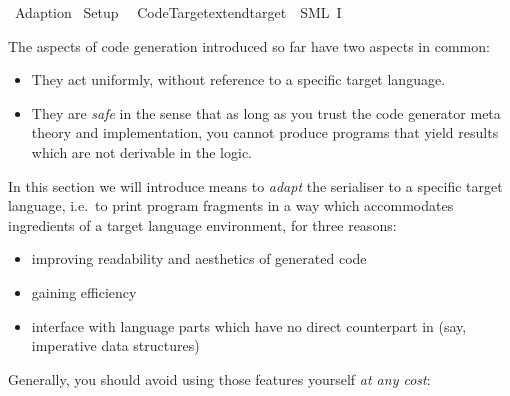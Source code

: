 %
\begin{isabellebody}%
\def\isabellecontext{Adaption}%
%
\isadelimtheory
%
\endisadelimtheory
%
\isatagtheory
{}\isamarkupfalse%
\ Adaption\isanewline
{}\ Setup\isanewline
{}%
\endisatagtheory
{\isafoldtheory}%
%
\isadelimtheory
\isanewline
%
\endisadelimtheory
%
\isadeliminvisible
\isanewline
%
\endisadeliminvisible
%
\isataginvisible
{}\isamarkupfalse%
\ {\isacharverbatimopen}\ Code{\isacharunderscore}Target{\isachardot}extend{\isacharunderscore}target\ {\isacharparenleft}{\isachardoublequote}{\isasymSML}{\isachardoublequote}{\isacharcomma}\ {\isacharparenleft}{\isachardoublequote}SML{\isachardoublequote}{\isacharcomma}\ I{\isacharparenright}{\isacharparenright}\ {\isacharverbatimclose}%
\endisataginvisible
{\isafoldinvisible}%
%
\isadeliminvisible
%
\endisadeliminvisible
%
\isamarkuptrue%
%
\isamarkuptrue%
%
\begin{isamarkuptext}%
The aspects of code generation introduced so far have two aspects
  in common:

  \begin{itemize}
    \item They act uniformly, without reference to a specific
       target language.
    \item They are \emph{safe} in the sense that as long as you trust
       the code generator meta theory and implementation, you cannot
       produce programs that yield results which are not derivable
       in the logic.
  \end{itemize}

  \noindent In this section we will introduce means to \emph{adapt} the serialiser
  to a specific target language, i.e.~to print program fragments
  in a way which accommodates  ingredients of
  a target language environment, for three reasons:

  \begin{itemize}
    \item improving readability and aesthetics of generated code
    \item gaining efficiency
    \item interface with language parts which have no direct counterpart
      in  (say, imperative data structures)
  \end{itemize}

  \noindent Generally, you should avoid using those features yourself
  \emph{at any cost}:


\end{isamarkuptext}
\end{isabellebody}
